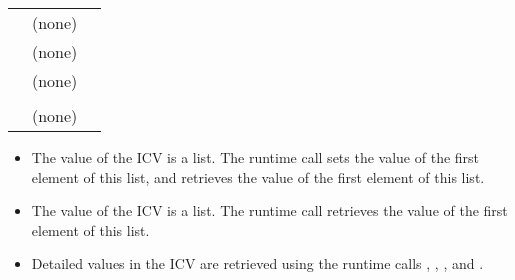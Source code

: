 {\begin{supertabular}{ p{1.2in} p{2.0in} p{1.5in}}
 & (none) & \\

 & (none) &  \\

 & (none) & \\

 &  & \\

 & (none) & \\

\end{supertabular}
\linenumbers} %

\comments
\begin{itemize}
\item The value of the  ICV is a list. The runtime call 
 sets the value of the first element of this list, and 
 retrieves the value of the first element of this list.

\item The value of the  ICV is a list. The runtime call  
retrieves the value of the first element of this list. 

\item 
Detailed values in the  ICV are retrieved using the runtime calls  
, , 
, and .
\end{itemize}

